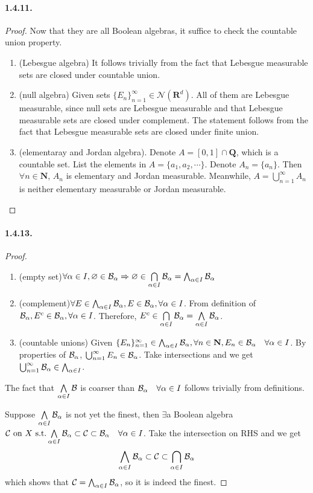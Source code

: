 \documentclass{article}
\begin{document}
\paragraph{1.4.11.}
\begin{proof}
Now that they are all Boolean algebras, it suffice to check the countable union property.
\begin{enumerate}
\item{(Lebesgue algebra)}
It follows trivially from the fact that Lebesgue measurable sets are closed under countable union.
\item{(null algebra)} Given sets $\{E_n\}_{n=1}^{\infty}\in \mathcal{N}(\mathbf{R}^d)$. All of them are Lebesgue measurable, since null sets are Lebesgue measurable and that Lebesgue measurable sets are closed under complement. The statement follows from the fact that Lebesgue measurable sets are closed under finite union.
\item{(elementaray and Jordan algebra)}. Denote $A=[0,1]\cap\mathbf{Q}$, which is a countable set. List the elements in $A=\{a_1,a_2,\cdots\}$. Denote $A_n=\{a_n\}$. Then $\forall n\in\mathbf{N}$, $A_n$ is elementary and Jordan measurable. Meanwhile, $A=\bigcup_{n=1}^{\infty}A_n$ is neither elementary measurable or Jordan measurable.
\end{enumerate}
\end{proof}
\paragraph{1.4.13.}
\begin{proof}
\begin{enumerate}
\item{(empty set)}$\forall \alpha\in I, \varnothing\in \mathcal{B}_\alpha\Rightarrow \varnothing\in \bigcap\limits_{\alpha\in I}\mathcal{B}_\alpha=\bigwedge_{\alpha\in I}\mathcal{B}_\alpha$
\item{(complement)}$\forall E\in\bigwedge_{\alpha\in I}\mathcal{B}_\alpha, E\in \mathcal{B}_\alpha,\forall \alpha\in I$. From definition of $\mathcal{B}_\alpha, E^c\in \mathcal{B}_\alpha,\forall \alpha\in I$. Therefore, $E^c\in \bigcap\limits_{\alpha\in I}\mathcal{B}_\alpha=\bigwedge\limits_{\alpha\in I}\mathcal{B}_{\alpha}$.
\item{(countable unions)} Given $\{E_n\}_{n=1}^{\infty}\in \bigwedge_{\alpha\in I}\mathcal{B}_\alpha, \forall n\in\mathbf{N},E_n\in \mathcal{B}_{\alpha}\quad\forall\alpha\in I$. By properties of $\mathcal{B}_{\alpha}$, $\bigcup_{n=1}^{\infty}E_n\in \mathcal{B}_\alpha$. Take intersections and we get $\bigcup_{n=1}^{\infty}\mathcal{B}_{\alpha}\in \bigwedge_{\alpha\in I}$.
\end{enumerate}
The fact that $\bigwedge\limits_{\alpha\in I}\mathcal{B}$ is coarser than $\mathcal{B}_{\alpha}\quad \forall \alpha\in I$ follows trivially from definitions.

Suppose $\bigwedge\limits_{\alpha\in I}\mathcal{B}_\alpha$ is not yet the finest, then $\exists $a Boolean algebra$\mathcal{C} \text{ on } X\text{ s.t.} \bigwedge\limits_{\alpha\in I}\mathcal{B}_\alpha\subset\mathcal{C}\subset \mathcal{B}_{\alpha}\quad \forall \alpha \in I$. Take the intersection on RHS and we get 
\[\bigwedge\limits_{\alpha\in I}\mathcal{B}_\alpha\subset\mathcal{C}\subset \bigcap_{\alpha\in I}\mathcal{B}_{\alpha}\] 
which shows that $\mathcal{C}=\bigwedge_{\alpha\in I}\mathcal{B}_\alpha$, so it is indeed the finest.
\end{proof}
\end{document}
